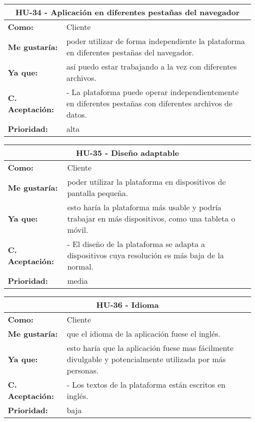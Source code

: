\begin{table}[H]
	\begin{tabular}{| p{3cm}| p{11cm} |}
		\hline
		\multicolumn{2}{|c|}{\textbf{HU-34} - Aplicación en diferentes pestañas del navegador} \\ \hline
		\textbf{Como:} & Cliente \\ \hline
		\textbf{Me gustaría:} & poder utilizar de forma independiente la plataforma en diferentes pestañas del navegador. \\ \hline
		\textbf{Ya que:} & así puedo estar trabajando a la vez con diferentes archivos. \\ \hline
		\textbf{C. Aceptación:} & - La plataforma puede operar independientemente en diferentes pestañas con diferentes archivos de datos. \\ \hline
		\textbf{\textbf{Prioridad:}} & alta \\ \hline
	\end{tabular}
\end{table}


\begin{table}[H]
	\begin{tabular}{| p{3cm}| p{11cm} |}
		\hline
		\multicolumn{2}{|c|}{\textbf{HU-35} - Diseño adaptable} \\ \hline
		\textbf{Como:} & Cliente \\ \hline
		\textbf{Me gustaría:} & poder utilizar la plataforma en dispositivos de pantalla pequeña. \\ \hline
		\textbf{Ya que:} & esto haría la plataforma más usable y podría trabajar en más dispositivos, como una tableta o móvil. \\ \hline
		\textbf{C. Aceptación:} & - El diseño de la plataforma se adapta a dispositivos cuya resolución es más baja de la normal. \\ \hline
		\textbf{\textbf{Prioridad:}} & media \\ \hline
	\end{tabular}
\end{table}


\begin{table}[H]
	\begin{tabular}{| p{3cm}| p{11cm} |}
		\hline
		\multicolumn{2}{|c|}{\textbf{HU-36} - Idioma} \\ \hline
		\textbf{Como:} & Cliente \\ \hline
		\textbf{Me gustaría:} & que el idioma de la aplicación fuese el inglés. \\ \hline
		\textbf{Ya que:} & esto haría que la aplicación fuese mas fácilmente divulgable y potencialmente utilizada por más personas. \\ \hline
		\textbf{C. Aceptación:} & - Los textos de la plataforma están escritos en inglés. \\ \hline
		\textbf{\textbf{Prioridad:}} & baja \\ \hline
	\end{tabular}
\end{table}


